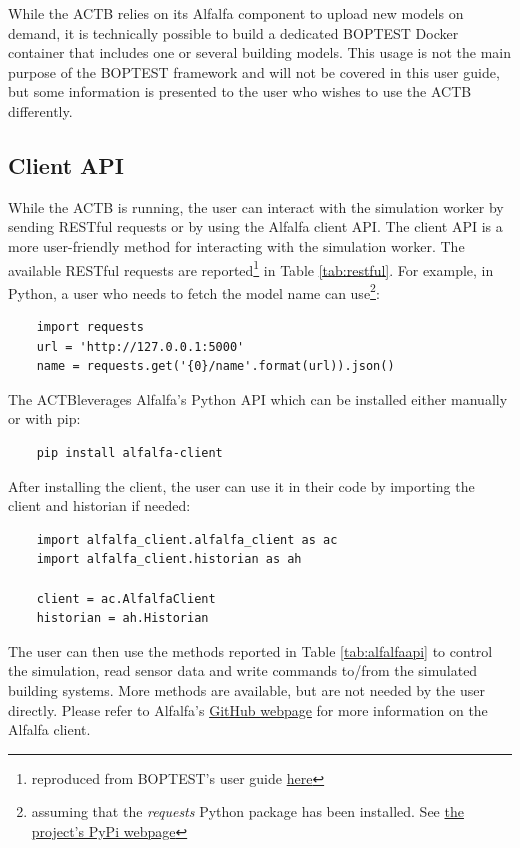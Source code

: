 \documentclass{article}
\begin{document}
While the ACTB relies on its Alfalfa component to upload new models on demand, it is technically possible to build a dedicated BOPTEST Docker container that includes one or several building models. This usage is not the main purpose of the BOPTEST framework and will not be covered in this user guide, but some information is presented to the user who wishes to use the ACTB differently.

\subsection{Client API}\label{s:client-api}

While the ACTB is running, the user can interact with the simulation worker by sending RESTful requests or by using the Alfalfa client API. The client API is a more user-friendly method for interacting with the simulation worker. The available RESTful requests are reported\footnote{reproduced from BOPTEST's user guide \href{https://github.com/ibpsa/project1-boptest}{here}} in Table \ref{tab:restful}. For example, in Python, a user who needs to fetch the model name can use\footnote{assuming that the \textit{requests}  Python package has been installed. See \href{https://pypi.org/project/requests/}{the project's PyPi webpage}}:

\begin{verbatim}
    import requests
    url = 'http://127.0.0.1:5000'
    name = requests.get('{0}/name'.format(url)).json()
\end{verbatim}

The ACTBleverages Alfalfa's Python API which can be installed either manually or with pip:

\begin{verbatim}
    pip install alfalfa-client
\end{verbatim}

After installing the client, the user can use it in their code by importing the client and historian if needed:

\begin{verbatim}
    import alfalfa_client.alfalfa_client as ac
    import alfalfa_client.historian as ah

    client = ac.AlfalfaClient
    historian = ah.Historian
\end{verbatim}

The user can then use the methods reported in Table \ref{tab:alfalfaapi} to control the simulation, read sensor data and write commands to/from the simulated building systems. More methods are available, but are not needed by the user directly. Please refer to Alfalfa's \href{https://github.com/NREL/alfalfa}{GitHub webpage} for more information on the Alfalfa client.
\end{document}
